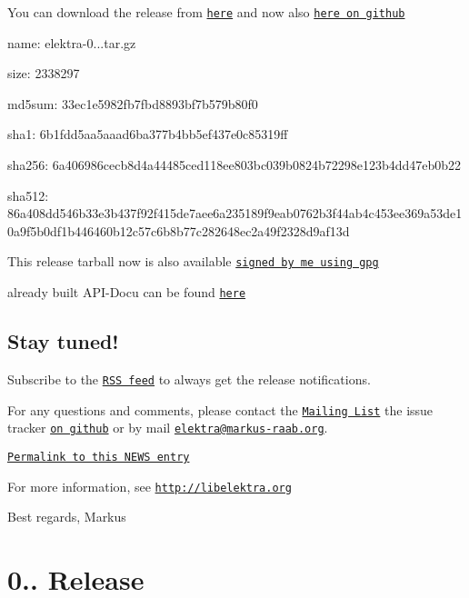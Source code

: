 You can download the release from \href{http://www.libelektra.org/ftp/elektra/releases/elektra-0.8.15.tar.gz}{\tt here} and now also \href{https://github.com/ElektraInitiative/ftp/tree/master/releases/elektra-0.8.15.tar.gz}{\tt here on github}


\begin{DoxyItemize}
\item name\+: elektra-\/0...\+tar.\+gz
\item size\+: 2338297
\item md5sum\+: 33ec1e5982fb7fbd8893bf7b579b80f0
\item sha1\+: 6b1fdd5aa5aaad6ba377b4bb5ef437e0c85319ff
\item sha256\+: 6a406986cecb8d4a44485ced118ee803bc039b0824b72298e123b4dd47eb0b22
\item sha512\+: 86a408dd546b33e3b437f92f415de7aee6a235189f9eab0762b3f44ab4c453ee369a53de10a9f5b0df1b446460b12c57c6b8b77c282648ec2a49f2328d9af13d
\end{DoxyItemize}

This release tarball now is also available \href{http://www.libelektra.org/ftp/elektra/releases/elektra-0.8.15.tar.gz.gpg}{\tt signed by me using gpg}

already built A\+P\+I-\/\+Docu can be found \href{http://doc.libelektra.org/api/0.8.15/html/}{\tt here}

\subsection*{Stay tuned!}

Subscribe to the \href{http://doc.libelektra.org/news/feed.rss}{\tt R\+S\+S feed} to always get the release notifications.

For any questions and comments, please contact the \href{https://lists.sourceforge.net/lists/listinfo/registry-list}{\tt Mailing List} the issue tracker \href{http://git.libelektra.org/issues}{\tt on github} or by mail \href{mailto:elektra@markus-raab.org}{\tt elektra@markus-\/raab.\+org}.

\href{http://doc.libelektra.org/news/1ab4a560-c286-46d2-a058-1a8e7e208fe8.html}{\tt Permalink to this N\+E\+W\+S entry}

For more information, see \href{http://libelektra.org}{\tt http\+://libelektra.\+org}

Best regards, Markus

\section*{0.. Release}



